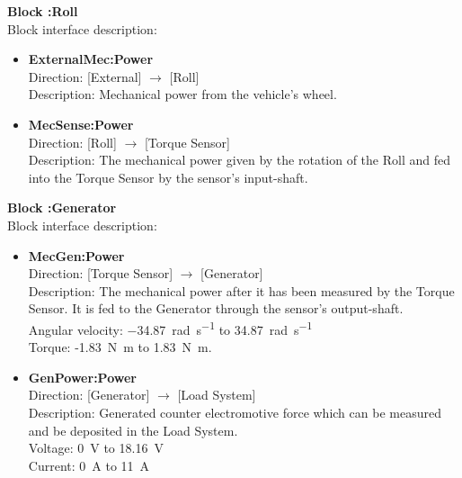 \textbf{Block :Roll}\\
Block interface description:
\begin{itemize}
	\item \textbf{ExternalMec:Power}\\
	Direction: [External] $\rightarrow$ [Roll]\\
	Description: Mechanical power from the vehicle's wheel.
	\item \textbf{MecSense:Power}\\
	Direction: [Roll] $\rightarrow$ [Torque Sensor]\\
	Description: The mechanical power given by the rotation of the Roll and fed into the Torque Sensor by the sensor's input-shaft.\\
\end{itemize}

\newpage	
\textbf{Block :Generator}\\
Block interface description:
\begin{itemize}
	\item \textbf{MecGen:Power}\\
	Direction: [Torque Sensor] $\rightarrow$ [Generator]\\
	Description: The mechanical power after it has been measured by the Torque Sensor. It is fed to the Generator through the sensor's output-shaft.\\
	Angular velocity: \SI{-34.87}{\radian \per \second} to \SI{34.87}{\radian \per \second}\\
	Torque: -\SI{1.83}{\newton \meter} to \SI{1.83}{\newton \meter}.
	\item \textbf{GenPower:Power}\\
	Direction: [Generator] $\rightarrow$ [Load System]\\
	Description: Generated counter electromotive force which can be measured and be deposited in the Load System.\\
	Voltage: \SI{0}{\volt} to \SI{18.16}{\volt}\\
	Current: \SI{0}{\ampere} to \SI{11}{\ampere}
\end{itemize}
			
